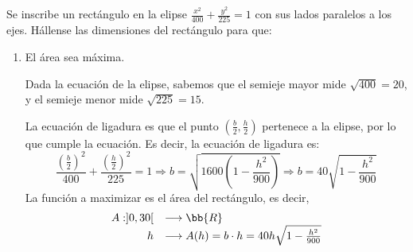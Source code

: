 \begin{ejercicio}
    Se inscribe un rectángulo en la elipse $\frac{x^2}{400} + \frac{y^2}{225} = 1$ con sus lados paralelos a los ejes. Hállense las dimensiones del rectángulo para que:
    \begin{enumerate}
        \item El área sea máxima.
        \begin{figure}[H]
            \centering
        \end{figure}
        Dada la ecuación de la elipse, sabemos que el semieje mayor mide $\sqrt{400}=20$, y el semieje menor mide $\sqrt{225}=15$.

        La ecuación de ligadura es que el punto $\left(\frac{b}{2}, \frac{h}{2}\right)$ pertenece a la elipse, por lo que cumple la ecuación. Es decir, la ecuación de ligadura es:
        \begin{equation*}
            \frac{\left(\frac{b}{2}\right)^2}{400} + \frac{\left(\frac{h}{2}\right)^2}{225} = 1 \Longrightarrow b = \sqrt{1600 \left(1 - \frac{h^2}{900} \right)} \Longrightarrow b= 40 \sqrt{1 - \frac{h^2}{900}}
        \end{equation*}
        La función a maximizar es el área del rectángulo, es decir,
        \begin{equation}\label{Ej4.1}
            \begin{array}{rl}
                A:]0, 30[ & \longrightarrow \bb{R}\\
                        h & \longrightarrow A(h) = b\cdot h = 40h \sqrt{1 - \frac{h^2}{900}}
            \end{array}
        \end{equation}


\end{enumerate}
\end{ejercicio}
